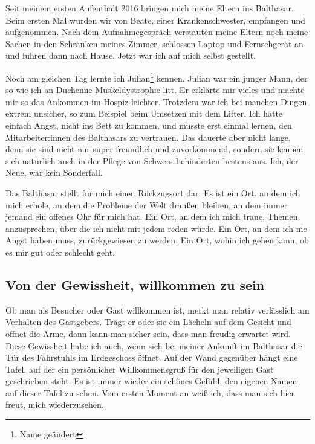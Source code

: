 \documentclass[fontsize=14pt,a4paper,headinclude,DIV=calc,automark]{scrbook}
\begin{document}
Seit meinem ersten Aufenthalt 2016 bringen mich meine Eltern ins Balthasar. Beim ersten Mal wurden wir von Beate, einer Krankenschwester, empfangen und aufgenommen. Nach dem Aufnahmegespräch verstauten meine Eltern noch meine Sachen in den Schränken meines Zimmer, schlossen Laptop und Fernsehgerät an und fuhren dann nach Hause. Jetzt war ich auf mich selbst gestellt.

Noch am gleichen Tag lernte ich Julian\footnote{Name geändert} kennen. Julian war ein junger Mann, der so wie ich an Duchenne Muskeldystrophie litt. Er erklärte mir vieles und machte mir so das Ankommen im Hospiz leichter. Trotzdem war ich bei manchen Dingen extrem unsicher, so zum Beispiel beim Umsetzen mit dem Lifter. Ich hatte einfach Angst, nicht ins Bett zu kommen, und musste erst einmal lernen, den Mitarbeiter:innen des Balthasars zu vertrauen. Das dauerte aber nicht lange, denn sie sind nicht nur super freundlich und zuvorkommend, sondern sie kennen sich natürlich auch in der Pflege von Schwerstbehinderten bestens aus. Ich, der Neue, war kein Sonderfall.

Das Balthasar stellt für mich einen Rückzugsort dar. Es ist ein Ort, an dem ich mich erhole, an dem die Probleme der Welt draußen bleiben, an dem immer jemand ein offenes Ohr für mich hat. Ein Ort, an dem ich mich traue, Themen anzusprechen, über die ich nicht mit jedem reden würde. Ein Ort, an dem ich nie Angst haben muss, zurückgewiesen zu werden. Ein Ort, wohin ich gehen kann, ob es mir gut oder schlecht geht.

\subsection{Von der Gewissheit, willkommen zu sein}

Ob man als Besucher oder Gast willkommen ist, merkt man relativ verlässlich am Verhalten des Gastgebers. Trägt er oder sie ein Lächeln auf dem Gesicht und öffnet die Arme, dann kann man sicher sein, dass man freudig erwartet wird. Diese Gewissheit habe ich auch, wenn sich bei meiner Ankunft im Balthasar die Tür des Fahrstuhls im Erdgeschoss öffnet. Auf der Wand gegenüber hängt eine Tafel, auf der ein persönlicher Willkommensgruß für den jeweiligen Gast geschrieben steht. Es ist immer wieder ein schönes Gefühl, den eigenen Namen auf dieser Tafel zu sehen. Vom ersten Moment an weiß ich, dass man sich hier freut, mich wiederzusehen.
\end{document}
